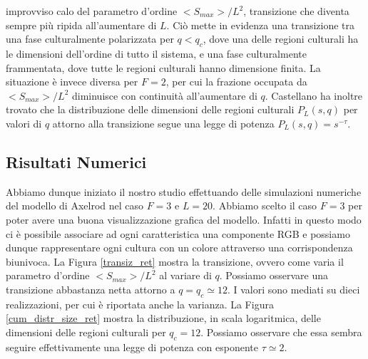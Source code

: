 \documentclass[a4paper,12pt]{article}
\begin{document}
improvviso calo del parametro d'ordine $<S_{max}>/L^2$, transizione che diventa sempre pi\`{u} ripida all'aumentare di $L$.
Ci\`{o} mette in evidenza una transizione tra una fase culturalmente polarizzata per $q<q_c$, dove una delle regioni culturali ha
le dimensioni dell'ordine di tutto il sistema, e una fase culturalmente frammentata, dove tutte le regioni culturali hanno dimensione finita.
La situazione \`{e} invece diversa per $F=2$, per cui la frazione occupata da $<S_{max}>/L^2$ diminuisce con continuit\`{a} all'aumentare di $q$.
Castellano ha inoltre trovato che la distribuzione delle dimensioni delle regioni culturali $P_L(s,q)$ per valori di $q$ attorno alla transizione
segue una legge di potenza $P_L(s,q) = s^{-\tau}$.

\subsection{Risultati Numerici}
Abbiamo dunque iniziato il nostro studio effettuando delle simulazioni numeriche del modello di Axelrod nel caso $F=3$ e $L=20$.
Abbiamo scelto il caso $F=3$ per poter avere una buona visualizzazione grafica del modello. Infatti in questo modo ci \`{e} possibile
associare ad ogni caratteristica una componente RGB e possiamo dunque rappresentare ogni cultura con un colore attraverso una
corrispondenza biunivoca.
La Figura \ref{transiz_ret} mostra la transizione, ovvero come varia il parametro d'ordine $<S_{max}>/L^2$ al variare di $q$. 
Possiamo osservare una transizione abbastanza netta attorno a $q = q_c \simeq 12$. I valori sono mediati su dieci realizzazioni, 
per cui \`{e} riportata anche la varianza.
La Figura \ref{cum_distr_size_ret} mostra la distribuzione, in scala logaritmica, delle dimensioni delle regioni culturali 
per $q_c = 12$. Possiamo osservare che essa sembra seguire effettivamente una legge di potenza con esponente $\tau \simeq 2$.
\end{document}
